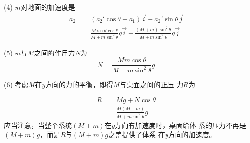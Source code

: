 (4) $ m $对地面的加速度是
\begin{align*}
  a _ { 2 } & = \left( a _ { 2 }' \cos \theta - a _ { 1 } \right) \vec{i} - a _ 2 ' \sin \theta \vec{j}                                                                                  \\
            & = \frac { M \sin \theta \cos \theta } { M + m \sin ^ { 2 } \theta } g \vec{i} - \frac { \left( M + m \right) \sin ^ { 2 } \theta } { M + m \sin ^ { 2 } \theta } g \vec{j}
\end{align*}

(5) $ m $与$ M $之间的作用力$ N $为
\begin{equation*}
  N = \frac { M m \cos \theta } { M + m \sin ^ { 2 } \theta } g
\end{equation*}

(6) 考虑$ M $在$ y $方向的力的平衡，即得$ M $与桌面之间的正压
力$ R $为

\begin{align*}
  R & = M g + N \cos \theta                                              \\
    & = \frac { M \left( M + m \right) } { M + m \sin ^ { 2 } \theta } g
\end{align*}
应当注意，当整个系统$ \left( M + m \right) $在$ y $方向有加速度时，桌面给体
系的压力不再是$ \left( M + m \right) g $，而是$ R $与$ \left( M + m \right) g $之差提供了体系
在$ y $方向的加速度。
